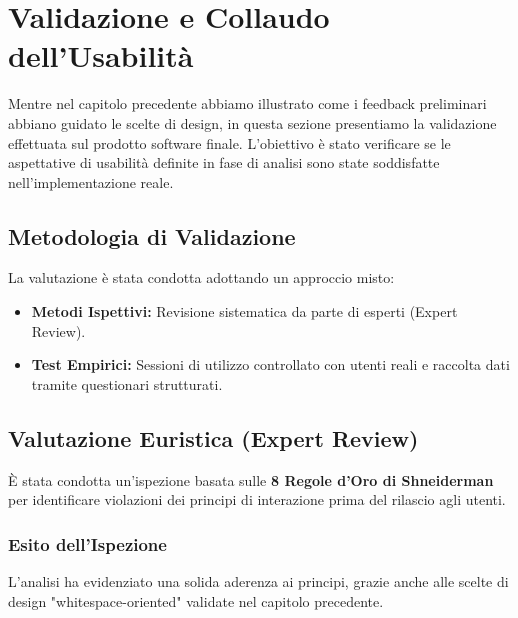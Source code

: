 \chapter{Validazione e Collaudo dell'Usabilità}
\label{cap:validazione_usabilita}

Mentre nel capitolo precedente abbiamo illustrato come i feedback preliminari abbiano guidato le scelte di design, in questa sezione presentiamo la validazione effettuata sul prodotto software finale.
L'obiettivo è stato verificare se le aspettative di usabilità definite in fase di analisi sono state soddisfatte nell'implementazione reale.

\section{Metodologia di Validazione}
La valutazione è stata condotta adottando un approccio misto:
\begin{itemize}
    \item \textbf{Metodi Ispettivi:} Revisione sistematica da parte di esperti (Expert Review).
    \item \textbf{Test Empirici:} Sessioni di utilizzo controllato con utenti reali e raccolta dati tramite questionari strutturati.
\end{itemize}

\section{Valutazione Euristica (Expert Review)}
\label{sec:expert_review}

È stata condotta un'ispezione basata sulle \textbf{8 Regole d'Oro di Shneiderman} per identificare violazioni dei principi di interazione prima del rilascio agli utenti.

\subsection{Esito dell'Ispezione}
L'analisi ha evidenziato una solida aderenza ai principi, grazie anche alle scelte di design "whitespace-oriented" validate nel capitolo precedente.


